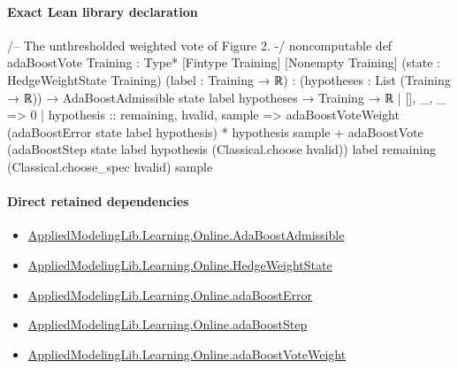 \documentclass[10pt]{article}
\begin{document}
\paragraph{Exact Lean library declaration}
\begin{ReviewVerbatim}
/-- The unthresholded weighted vote of Figure 2. -/
noncomputable def adaBoostVote
    {Training : Type*} [Fintype Training] [Nonempty Training]
    (state : HedgeWeightState Training) (label : Training → ℝ) :
    (hypotheses : List (Training → ℝ)) →
      AdaBoostAdmissible state label hypotheses → Training → ℝ
  | [], _, _ => 0
  | hypothesis :: remaining, hvalid, sample =>
      adaBoostVoteWeight (adaBoostError state label hypothesis) * hypothesis sample +
        adaBoostVote
          (adaBoostStep state label hypothesis (Classical.choose hvalid)) label remaining
          (Classical.choose_spec hvalid) sample
\end{ReviewVerbatim}

\paragraph{Direct retained dependencies}
\begin{itemize}\raggedright
\item \hyperlink{library-prerequisite-2771987b29f636cf}{Applied\allowbreak{}Modeling\allowbreak{}Lib.\allowbreak{}Learning.\allowbreak{}Online.\allowbreak{}Ada\allowbreak{}Boost\allowbreak{}Admissible}
\item \hyperlink{library-prerequisite-8196082d02788389}{Applied\allowbreak{}Modeling\allowbreak{}Lib.\allowbreak{}Learning.\allowbreak{}Online.\allowbreak{}Hedge\allowbreak{}Weight\allowbreak{}State}
\item \hyperlink{governing-declaration-bd631eacbec4687c}{Applied\allowbreak{}Modeling\allowbreak{}Lib.\allowbreak{}Learning.\allowbreak{}Online.\allowbreak{}ada\allowbreak{}Boost\allowbreak{}Error}
\item \hyperlink{governing-declaration-ab9e0307acbbe7ff}{Applied\allowbreak{}Modeling\allowbreak{}Lib.\allowbreak{}Learning.\allowbreak{}Online.\allowbreak{}ada\allowbreak{}Boost\allowbreak{}Step}
\item \hyperlink{governing-declaration-4fae1388d9e0485c}{Applied\allowbreak{}Modeling\allowbreak{}Lib.\allowbreak{}Learning.\allowbreak{}Online.\allowbreak{}ada\allowbreak{}Boost\allowbreak{}Vote\allowbreak{}Weight}
\end{itemize}
\end{document}
